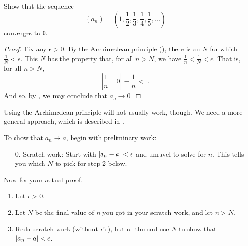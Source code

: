 \documentclass[11pt,twoside=off,numbers=noenddot]{scrbook}
\begin{document}
\begin{example}
  Show that the sequence
  \[ (a_n) = \left(1, \frac{1}{2}, \frac{1}{3}, \frac{1}{4},
  \frac{1}{5}, \dots\right) \]
  converges to 0.

  \begin{proof}
    Fix any $\epsilon > 0$. By the Archimedean principle
    (), there is an $N$ for which
    $\frac{1}{N} < \epsilon$. This $N$ has the property
    that, for all $n > N$, we have $\frac{1}{n} < \frac{1}{N} <
    \epsilon$. That is, for all $n > N$,
    \[ \left|\frac{1}{n} - 0\right| = \frac{1}{n} < \epsilon. \]
    And so, by , we may conclude that
    $a_n \to 0$.
  \end{proof}
\end{example}

\begin{remark}
  Using the Archimedean principle will not usually work, though. We
  need a more general approach, which is described in
  .
\end{remark}

\begin{outline}
  To show that $a_n \to a$, begin with preliminary work:
  \begin{enumerate}
    \item[0.] Scratch work: Start with $| a_n - a | < \epsilon$ and
      unravel to solve for $n$. This tells you which $N$ to pick for
      step 2 below.
  \end{enumerate}
  Now for your actual proof:
  \begin{enumerate}
    \item Let $\epsilon > 0$.
    \item Let $N$ be the final value of $n$ you got in your scratch
      work, and let $n > N$.
    \item Redo scratch work (without $\epsilon$'s), but at the end
      use $N$ to show that $| a_n - a | < \epsilon$.
  \end{enumerate}
\end{outline}
\end{document}
